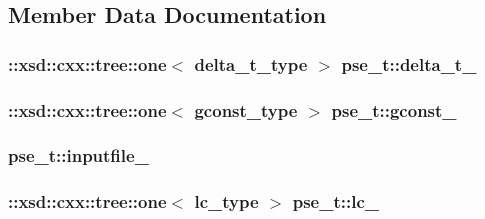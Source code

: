 \subsection{Member Data Documentation}
\hypertarget{classpse__t_ab25fd51647edb6fe1f7cb87489d9fa66}{
\subsubsection[{delta\-\_\-t\-\_\-}]{\setlength{\rightskip}{0pt plus 5cm}\-::xsd\-::cxx\-::tree\-::one$<$ {\bf delta\-\_\-t\-\_\-type} $>$ pse\-\_\-t\-::delta\-\_\-t\-\_\-\hspace{0.3cm}{\ttfamily [protected]}}}\label{classpse__t_ab25fd51647edb6fe1f7cb87489d9fa66}
\hypertarget{classpse__t_ace4fd13345230aae4ebce2010215fa43}{
\subsubsection[{gconst\-\_\-}]{\setlength{\rightskip}{0pt plus 5cm}\-::xsd\-::cxx\-::tree\-::one$<$ {\bf gconst\-\_\-type} $>$ pse\-\_\-t\-::gconst\-\_\-\hspace{0.3cm}{\ttfamily [protected]}}}\label{classpse__t_ace4fd13345230aae4ebce2010215fa43}
\hypertarget{classpse__t_a7c156cd2ed2e3501fe3f7f1e40116c60}{
\subsubsection[{inputfile\-\_\-}]{ pse\-\_\-t\-::inputfile\-\_\-\hspace{0.3cm}{\ttfamily [protected]}}}\label{classpse__t_a7c156cd2ed2e3501fe3f7f1e40116c60}
\hypertarget{classpse__t_a9fd16cb0ce41afb6a52d300c67ab0d44}{
\subsubsection[{lc\-\_\-}]{\setlength{\rightskip}{0pt plus 5cm}\-::xsd\-::cxx\-::tree\-::one$<$ {\bf lc\-\_\-type} $>$ pse\-\_\-t\-::lc\-\_\-\hspace{0.3cm}{\ttfamily [protected]}}}\label{classpse__t_a9fd16cb0ce41afb6a52d300c67ab0d44}
